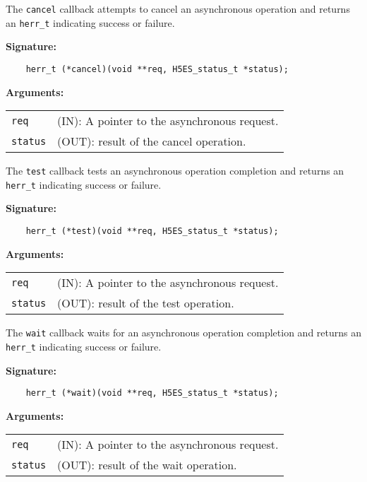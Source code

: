 The \texttt{cancel} callback attempts to cancel an asynchronous operation
and returns an \texttt{herr\_t} indicating success or failure.\bigskip

\begin{mdframed}[style=bgbox]
\textbf{Signature:}
\begin{lstlisting}
    herr_t (*cancel)(void **req, H5ES_status_t *status);
\end{lstlisting}

\textbf{Arguments:}\\
\begin{tabular}{l p{13.5cm}}
  \texttt{req} & (IN): A pointer to the asynchronous request.\\
  \texttt{status} & (OUT): result of the cancel operation.\\
\end{tabular}
\end{mdframed}

The \texttt{test} callback tests an asynchronous operation completion
and returns an \texttt{herr\_t} indicating success or failure.\bigskip

\begin{mdframed}[style=bgbox]
\textbf{Signature:}
\begin{lstlisting}
    herr_t (*test)(void **req, H5ES_status_t *status);
\end{lstlisting}

\textbf{Arguments:}\\
\begin{tabular}{l p{13.5cm}}
  \texttt{req} & (IN): A pointer to the asynchronous request.\\
  \texttt{status} & (OUT): result of the test operation.\\
\end{tabular}
\end{mdframed}

The \texttt{wait} callback waits for an asynchronous operation completion
and returns an \texttt{herr\_t} indicating success or failure.\bigskip

\begin{mdframed}[style=bgbox]
\textbf{Signature:}
\begin{lstlisting}
    herr_t (*wait)(void **req, H5ES_status_t *status);
\end{lstlisting}

\textbf{Arguments:}\\
\begin{tabular}{l p{13.5cm}}
  \texttt{req} & (IN): A pointer to the asynchronous request.\\
  \texttt{status} & (OUT): result of the wait operation.\\
\end{tabular}
\end{mdframed}

